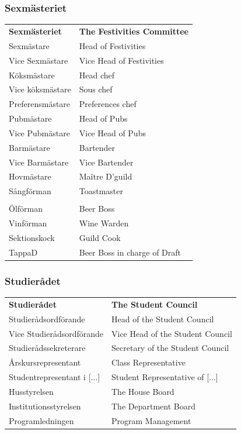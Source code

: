 \documentclass{dsekprotokoll}
\begin{document}
\subsubsection*{Sexmästeriet}
\vspace{12pt}
\begin{center}
    \begin{tabular}{R{6.5cm}|L{6.5cm}}
        \textbf{Sexmästeriet} & \textbf{The Festivities Committee}\\
        Sexmästare & Head of Festivities\\
        Vice Sexmästare & Vice Head of Festivities\\
        Köksmästare & Head chef\\
        Vice köksmästare & Sous chef\\
        Preferensmästare & Preferences chef\\
        Pubmästare & Head of Pubs\\
        Vice Pubmästare & Vice Head of Pubs\\
        Barmästare & Bartender\\
        Vice Barmästare & Vice Bartender\\
        Hovmästare & Maître D'guild\\
        Sångförman & Toastmaster\\
        \\

        Ölförman & Beer Boss\\
        Vinförman & Wine Warden\\
        Sektionskock & Guild Cook\\
        TappaD & Beer Boss in charge of Draft\\
    \end{tabular}
\end{center}

\subsubsection*{Studierådet}
\vspace{12pt}
\begin{center}
    \begin{tabular}{R{6.5cm}|L{6.5cm}}
        \textbf{Studierådet} & \textbf{The Student Council}\\
        Studierådsordförande & Head of the Student Council\\
        Vice Studierådsordförande & Vice Head of the Student Council\\
        Studierådssekreterare & Secretary of the Student Council\\
        Årskursrepresentant & Class Representative\\
        Studentrepresentant i [...] & Student Representative of [...]\\
        Husstyrelsen & The House Board\\
        Institutionsstyrelsen & The Department Board\\
        Programledningen & Program Management\\
    \end{tabular}
\end{center}
\end{document}
